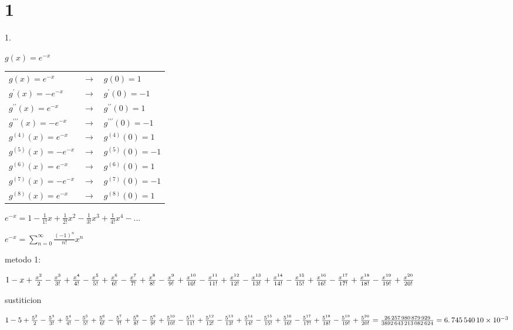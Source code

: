 \documentclass{article}
\begin{document}
\section{1}

1.

$g(x)=e^{-x}$

\begin{tabular}{lll}
$g(x)=\allowbreak e^{-x}$ & $\rightarrow $ & $g(0)=\allowbreak \allowbreak 1$
\\ 
$g^{\prime }(x)=-e^{-x}$ & $\rightarrow $ & $g^{\prime }(0)=\allowbreak -1$
\\ 
$g^{\prime \prime }(x)=\allowbreak e^{-x}$ & $\rightarrow $ & $g^{\prime
\prime }(0)=\allowbreak \allowbreak 1$ \\ 
$g^{\prime \prime \prime }(x)=\allowbreak \allowbreak -e^{-x}$ & $%
\rightarrow $ & $g^{\prime \prime \prime }(0)=\allowbreak \allowbreak -1$ \\ 
$g^{(4)}(x)=\allowbreak e^{-x}$ & $\rightarrow $ & $g^{(4)}(0)=\allowbreak 1$
\\ 
$g^{(5)}(x)=\allowbreak -e^{-x}$ & $\rightarrow $ & $g^{(5)}(0)=\allowbreak
-1$ \\ 
$g^{(6)}(x)=\allowbreak e^{-x}$ & $\rightarrow $ & $g^{(6)}(0)=\allowbreak
\allowbreak 1$ \\ 
$g^{(7)}(x)=\allowbreak \allowbreak -e^{-x}$ & $\rightarrow $ & $%
g^{(7)}(0)=\allowbreak -1$ \\ 
$g^{(8)}(x)=\allowbreak \allowbreak e^{-x}$ & $\rightarrow $ & $%
g^{(8)}(0)=\allowbreak 1$%
\end{tabular}

$e^{-x}=1-\frac{1}{1!}x+\frac{1}{2!}x^{2}-\frac{1}{3!}x^{3}+\frac{1}{4!}%
x^{4}-...$

$e^{-x}=\sum_{n=0}^{\infty }\frac{(-1)^{n}}{n!}x^{n}$\newline

metodo 1:

$1-x+\frac{x^{2}}{2}-\frac{x^{3}}{3!}+\frac{x^{4}}{4!}-\frac{x^{5}}{5!}+%
\frac{x^{6}}{6!}-\frac{x^{7}}{7!}+\frac{x^{8}}{8!}-\frac{x^{9}}{9!}+\frac{%
x^{10}}{10!}-\frac{x^{11}}{11!}+\frac{x^{12}}{12!}-\frac{x^{13}}{13!}+\frac{%
x^{14}}{14!}-\frac{x^{15}}{15!}+\frac{x^{16}}{16!}-\frac{x^{17}}{17!}+\frac{%
x^{18}}{18!}-\frac{x^{19}}{19!}+\frac{x^{20}}{20!}$

sustiticion

$1-5+\frac{5^{2}}{2}-\frac{5^{3}}{3!}+\frac{5^{4}}{4!}-\frac{5^{5}}{5!}+%
\frac{5^{6}}{6!}-\frac{5^{7}}{7!}+\frac{5^{8}}{8!}-\frac{5^{9}}{9!}+\frac{%
5^{10}}{10!}-\frac{5^{11}}{11!}+\frac{5^{12}}{12!}-\frac{5^{13}}{13!}+\frac{%
5^{14}}{14!}-\frac{5^{15}}{15!}+\frac{5^{16}}{16!}-\frac{5^{17}}{17!}+\frac{%
5^{18}}{18!}-\frac{5^{19}}{19!}+\frac{5^{20}}{20!}=\allowbreak \frac{%
26\,257\,\allowbreak 980\,879\,929}{3892\,643\,\allowbreak 213\,082\,624}%
=\allowbreak 6.\,\allowbreak 745\,540\,10\times 10^{-3}$
\end{document}
